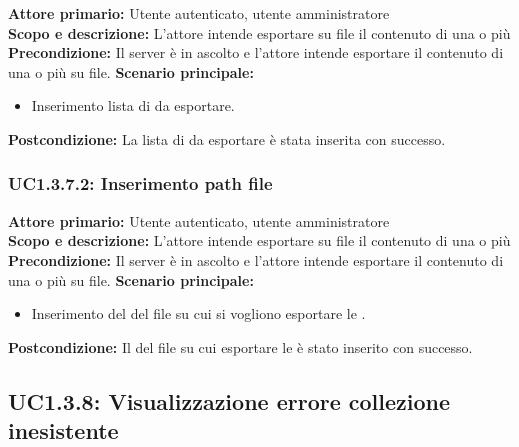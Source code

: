 \documentclass{scalatekids-article}
\begin{document}
\textbf{Attore primario:} Utente autenticato, utente amministratore\\
\textbf{Scopo e descrizione:} L'attore intende esportare su file il contenuto di una o più \\
\textbf{Precondizione:} Il server è in ascolto e l'attore intende esportare il contenuto di una o più  su file.
\textbf{Scenario principale:}
\begin{itemize}
\item Inserimento lista di  da esportare.
\end{itemize}
\textbf{Postcondizione:} La lista di  da esportare è stata inserita con successo.

\subsubsection{UC1.3.7.2: Inserimento path file}

\textbf{Attore primario:} Utente autenticato, utente amministratore\\
\textbf{Scopo e descrizione:} L'attore intende esportare su file il contenuto di una o più \\
\textbf{Precondizione:} Il server è in ascolto e l'attore intende esportare il contenuto di una o più  su file.
\textbf{Scenario principale:}
\begin{itemize}
\item Inserimento del  del file su cui si vogliono esportare le .
\end{itemize}
\textbf{Postcondizione:} Il  del file su cui esportare le  è stato inserito con successo.

\subsection{UC1.3.8: Visualizzazione errore collezione inesistente}
\end{document}
